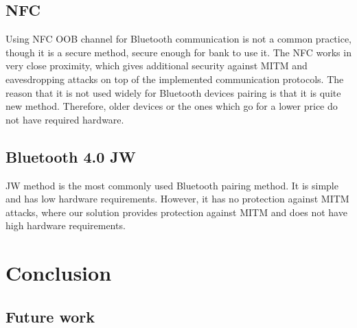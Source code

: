 \documentclass[12pt]{article}
\begin{document}
\subsection{NFC}
\label{sub:Image scanning}

Using NFC OOB channel for Bluetooth communication is not a common practice, though it is a secure method, secure enough for bank to use it. The NFC works in very close proximity, which gives additional security against MITM and eavesdropping attacks on top of the implemented communication protocols. The reason that it is not used widely for Bluetooth devices pairing is that it is quite new method. Therefore, older devices or the ones which go for a lower price do not have required hardware.

\newpage
\subsection{Bluetooth 4.0 JW}
\label{sub:Bluetooth 4.0 JW}

JW method is the most commonly used Bluetooth pairing method. It is simple and has low hardware requirements. However, it has no protection against MITM attacks, where our solution provides protection against MITM and does not have high hardware requirements.

\section{Conclusion}
\label{sec:Conclusion}
\subsection{Future work}
\label{sub:future work}

\newpage


\nocite{*}

\end{document}
